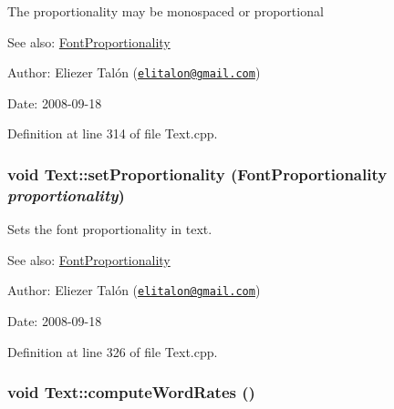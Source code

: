 The proportionality may be monospaced or proportional

\begin{Desc}
\item[See also:]\hyperlink{_font_proportionality_8h_a9aa255df24db58a9b4cbc46941f2ac1}{FontProportionality}\end{Desc}
\begin{Desc}
\item[Author:]Eliezer Talón (\href{mailto:elitalon@gmail.com}{\tt elitalon@gmail.com}) \end{Desc}
\begin{Desc}
\item[Date:]2008-09-18 \end{Desc}


Definition at line 314 of file Text.cpp.\hypertarget{class_text_3b2b58565dd9f580163d9efb827e995d}{
\subsubsection[setProportionality]{\setlength{\rightskip}{0pt plus 5cm}void Text::setProportionality ({\bf FontProportionality} {\em proportionality})}}
\label{class_text_3b2b58565dd9f580163d9efb827e995d}


Sets the font proportionality in text. 

\begin{Desc}
\item[See also:]\hyperlink{_font_proportionality_8h_a9aa255df24db58a9b4cbc46941f2ac1}{FontProportionality}\end{Desc}
\begin{Desc}
\item[Author:]Eliezer Talón (\href{mailto:elitalon@gmail.com}{\tt elitalon@gmail.com}) \end{Desc}
\begin{Desc}
\item[Date:]2008-09-18 \end{Desc}


Definition at line 326 of file Text.cpp.\hypertarget{class_text_8239e13039bcc1c713f66f1236693706}{
\subsubsection[computeWordRates]{\setlength{\rightskip}{0pt plus 5cm}void Text::computeWordRates ()}}
\label{class_text_8239e13039bcc1c713f66f1236693706}


